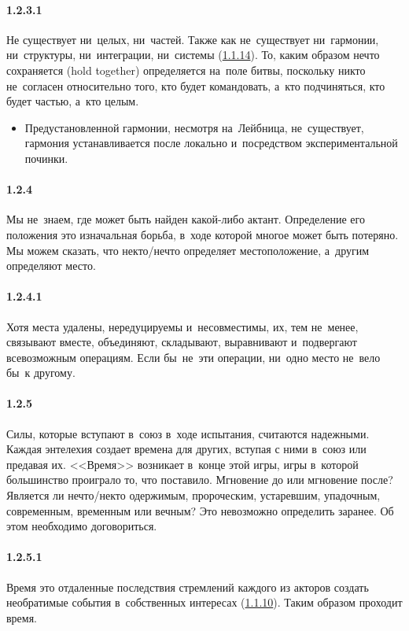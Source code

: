 \paragraph{1.2.3.1}\hypertarget{par:1.2.3.1}{} Не существует ни~целых, ни~частей. Также как не~существует ни~гармонии, ни~структуры, ни~интеграции, ни~системы (\hyperlink{par:1.1.14}{1.1.14}). То, каким образом нечто сохраняется
(hold together) определяется на~поле битвы, поскольку никто не~согласен относительно того, кто будет командовать, а~кто подчиняться, кто будет частью, а~кто целым. 
	\begin{itemize}
	\item Предустановленной гармонии, несмотря на~Лейбница, не~существует, гармония устанавливается после локально и~посредством экспериментальной починки.
	\end{itemize}

\paragraph{1.2.4}\hypertarget{par:1.2.4}{} Мы не~знаем, где может быть найден какой-либо актант. Определение его положения это изначальная борьба, в~ходе которой многое может быть потеряно. Мы можем сказать, что некто/нечто определяет местоположение, а~другим определяют место.

\paragraph{1.2.4.1}\hypertarget{par:1.2.4.1}{} Хотя места удалены, нередуцируемы и~несовместимы, их, тем не~менее, связывают
вместе, объединяют, складывают, выравнивают и~подвергают всевозможным
операциям. Если бы~не~эти операции, ни~одно место не~вело бы~к другому.

\paragraph{1.2.5}\hypertarget{par:1.2.5}{} Силы, которые вступают в~союз в~ходе испытания, считаются надежными. Каждая энтелехия создает времена для других, вступая с ними в~союз или предавая их. <<Время>> возникает в~конце этой игры, игры в~которой большинство проиграло то, что поставило.
Мгновение до или мгновение после? Является ли нечто/некто одержимым, пророческим, устаревшим, упадочным, современным, временным или вечным? Это невозможно определить заранее. Об этом необходимо договориться.

\paragraph{1.2.5.1}\hypertarget{par:1.2.5.1}{} Время это отдаленные последствия стремлений каждого из акторов создать необратимые события в~собственных интересах (\hyperlink{par:1.1.10}{1.1.10}). Таким образом проходит время.

